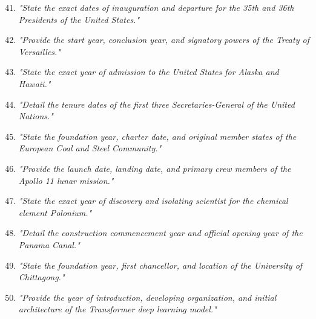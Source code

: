 \begin{enumerate}
    \setcounter{enumi}{40}
    \item \textit{"State the exact dates of inauguration and departure for the 35th and 36th Presidents of the United States."}
    \item \textit{"Provide the start year, conclusion year, and signatory powers of the Treaty of Versailles."}
    \item \textit{"State the exact year of admission to the United States for Alaska and Hawaii."}
    \item \textit{"Detail the tenure dates of the first three Secretaries-General of the United Nations."}
    \item \textit{"State the foundation year, charter date, and original member states of the European Coal and Steel Community."}
    \item \textit{"Provide the launch date, landing date, and primary crew members of the Apollo 11 lunar mission."}
    \item \textit{"State the exact year of discovery and isolating scientist for the chemical element Polonium."}
    \item \textit{"Detail the construction commencement year and official opening year of the Panama Canal."}
    \item \textit{"State the foundation year, first chancellor, and location of the University of Chittagong."}
    \item \textit{"Provide the year of introduction, developing organization, and initial architecture of the Transformer deep learning model."}
\end{enumerate}
